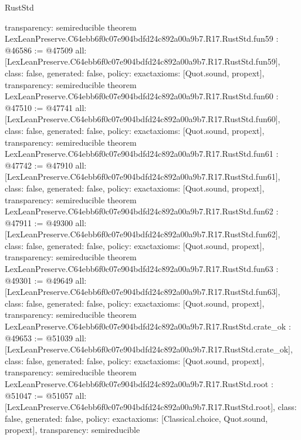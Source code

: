 \begin{lexlean}{RustStd}
\begin{coremodule}
{  transparency: semireducible
}
theorem LexLeanPreserve.C64ebb6f0c07e904bdfd24c892a00a9b7.R17.RustStd.fun59 : @46586 := @47509 {
  all: [LexLeanPreserve.C64ebb6f0c07e904bdfd24c892a00a9b7.R17.RustStd.fun59],
  class: false,
  generated: false,
  policy: exact{axioms: [Quot.sound, propext]},
  transparency: semireducible
}
theorem LexLeanPreserve.C64ebb6f0c07e904bdfd24c892a00a9b7.R17.RustStd.fun60 : @47510 := @47741 {
  all: [LexLeanPreserve.C64ebb6f0c07e904bdfd24c892a00a9b7.R17.RustStd.fun60],
  class: false,
  generated: false,
  policy: exact{axioms: [Quot.sound, propext]},
  transparency: semireducible
}
theorem LexLeanPreserve.C64ebb6f0c07e904bdfd24c892a00a9b7.R17.RustStd.fun61 : @47742 := @47910 {
  all: [LexLeanPreserve.C64ebb6f0c07e904bdfd24c892a00a9b7.R17.RustStd.fun61],
  class: false,
  generated: false,
  policy: exact{axioms: [Quot.sound, propext]},
  transparency: semireducible
}
theorem LexLeanPreserve.C64ebb6f0c07e904bdfd24c892a00a9b7.R17.RustStd.fun62 : @47911 := @49300 {
  all: [LexLeanPreserve.C64ebb6f0c07e904bdfd24c892a00a9b7.R17.RustStd.fun62],
  class: false,
  generated: false,
  policy: exact{axioms: [Quot.sound, propext]},
  transparency: semireducible
}
theorem LexLeanPreserve.C64ebb6f0c07e904bdfd24c892a00a9b7.R17.RustStd.fun63 : @49301 := @49649 {
  all: [LexLeanPreserve.C64ebb6f0c07e904bdfd24c892a00a9b7.R17.RustStd.fun63],
  class: false,
  generated: false,
  policy: exact{axioms: [Quot.sound, propext]},
  transparency: semireducible
}
theorem LexLeanPreserve.C64ebb6f0c07e904bdfd24c892a00a9b7.R17.RustStd.crate_ok : @49653 := @51039 {
  all: [LexLeanPreserve.C64ebb6f0c07e904bdfd24c892a00a9b7.R17.RustStd.crate_ok],
  class: false,
  generated: false,
  policy: exact{axioms: [Quot.sound, propext]},
  transparency: semireducible
}
theorem LexLeanPreserve.C64ebb6f0c07e904bdfd24c892a00a9b7.R17.RustStd.root : @51047 := @51057 {
  all: [LexLeanPreserve.C64ebb6f0c07e904bdfd24c892a00a9b7.R17.RustStd.root],
  class: false,
  generated: false,
  policy: exact{axioms: [Classical.choice, Quot.sound, propext]},
  transparency: semireducible
}


\end{coremodule}
\end{lexlean}
